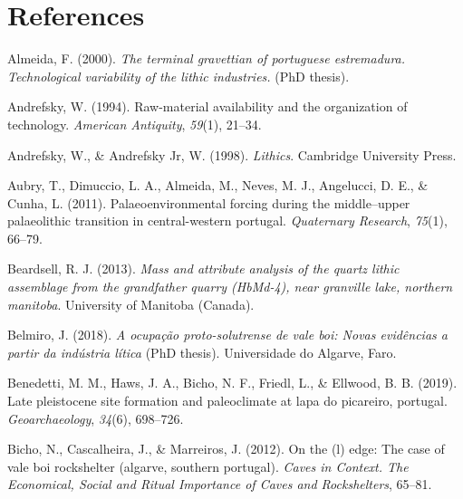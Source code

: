 \documentclass[12pt,twoside]{reedthesis}
\begin{document}
\hypertarget{references}{%
\chapter*{References}\label{references}}


\noindent

\setlength{\parindent}{-0.20in}
\setlength{\leftskip}{0.20in}
\setlength{\parskip}{8pt}

\hypertarget{refs}{}
\leavevmode\hypertarget{ref-almeida2000}{}%
Almeida, F. (2000). \emph{The terminal gravettian of portuguese estremadura. Technological variability of the lithic industries.} (PhD thesis).

\leavevmode\hypertarget{ref-andrefsky1994}{}%
Andrefsky, W. (1994). Raw-material availability and the organization of technology. \emph{American Antiquity}, \emph{59}(1), 21--34.

\leavevmode\hypertarget{ref-andrefsky1998}{}%
Andrefsky, W., \& Andrefsky Jr, W. (1998). \emph{Lithics}. Cambridge University Press.

\leavevmode\hypertarget{ref-aubryetal2011}{}%
Aubry, T., Dimuccio, L. A., Almeida, M., Neves, M. J., Angelucci, D. E., \& Cunha, L. (2011). Palaeoenvironmental forcing during the middle--upper palaeolithic transition in central-western portugal. \emph{Quaternary Research}, \emph{75}(1), 66--79.

\leavevmode\hypertarget{ref-beardsell2013}{}%
Beardsell, R. J. (2013). \emph{Mass and attribute analysis of the quartz lithic assemblage from the grandfather quarry (HbMd-4), near granville lake, northern manitoba}. University of Manitoba (Canada).

\leavevmode\hypertarget{ref-belmiro2018}{}%
Belmiro, J. (2018). \emph{A ocupação proto-solutrense de vale boi: Novas evidências a partir da indústria lítica} (PhD thesis). Universidade do Algarve, Faro.

\leavevmode\hypertarget{ref-benedettietal2019}{}%
Benedetti, M. M., Haws, J. A., Bicho, N. F., Friedl, L., \& Ellwood, B. B. (2019). Late pleistocene site formation and paleoclimate at lapa do picareiro, portugal. \emph{Geoarchaeology}, \emph{34}(6), 698--726.

\leavevmode\hypertarget{ref-bichoetal2012}{}%
Bicho, N., Cascalheira, J., \& Marreiros, J. (2012). On the (l) edge: The case of vale boi rockshelter (algarve, southern portugal). \emph{Caves in Context. The Economical, Social and Ritual Importance of Caves and Rockshelters}, 65--81.
\end{document}
